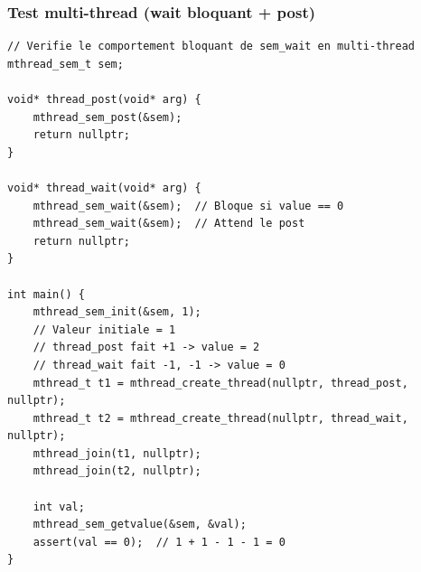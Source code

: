 \documentclass[12pt,a4paper]{article}
\begin{document}
\subsubsection*{Test multi-thread (wait bloquant + post)}

\begin{lstlisting}
// Verifie le comportement bloquant de sem_wait en multi-thread
mthread_sem_t sem;

void* thread_post(void* arg) {
    mthread_sem_post(&sem);
    return nullptr;
}

void* thread_wait(void* arg) {
    mthread_sem_wait(&sem);  // Bloque si value == 0
    mthread_sem_wait(&sem);  // Attend le post
    return nullptr;
}

int main() {
    mthread_sem_init(&sem, 1);
    // Valeur initiale = 1
    // thread_post fait +1 -> value = 2
    // thread_wait fait -1, -1 -> value = 0
    mthread_t t1 = mthread_create_thread(nullptr, thread_post, nullptr);
    mthread_t t2 = mthread_create_thread(nullptr, thread_wait, nullptr);
    mthread_join(t1, nullptr);
    mthread_join(t2, nullptr);

    int val;
    mthread_sem_getvalue(&sem, &val);
    assert(val == 0);  // 1 + 1 - 1 - 1 = 0
}
\end{lstlisting}
\end{document}

